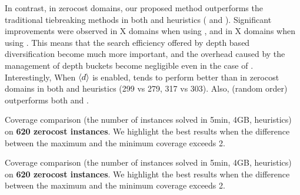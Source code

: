 

In contrast, 
in zerocost domains, our proposed method outperforms the traditional
tiebreaking methods in both \lmcut and \mands heuristics
( and ).
Significant improvements were observed in X domains when using \lmcut,
and in X domains when using \mands.
This means that the search efficiency offered by depth based diversification
become much more important, and the overhead caused
by the management of depth buckets become negligible even in the case of \mands.
Interestingly, When ${\left<d\right>}$ is enabled, \fifo tends to perform better
than \lifo in
zerocost domains in both \lmcut and \mands heuristics (299 vs 279, 317
vs 303). Also, \ro (random order) outperforms both \fifo and \lifo.

\begin{table}[htbp]
 {
 \centering
 
  \caption{
 Coverage comparison (the number of instances solved in 5min, 4GB, \lmcut heuristics) 
 on \textbf{620 zerocost instances}. We highlight the
 best results when the difference between the maximum and the minimum coverage exceeds 2.
 }
 \label{tbl:lmcut-zerocost-full}
 }
\end{table}

\begin{table}[htbp]
 {
 \centering
 
  \caption{
 Coverage comparison (the number of instances solved in 5min, 4GB, \mands heuristics)
 on \textbf{620 zerocost instances}. We highlight the
 best results when the difference between the maximum and the minimum coverage exceeds 2.
 }
 \label{tbl:mands-zerocost-full}
 }
\end{table}

\clearpage

